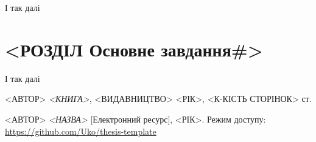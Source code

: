 \documentclass[12pt,a4paper]{article}
\begin{document}
І так далі\cite{web}

\clearpage
\section{<РОЗДІЛ Основне завдання\#>}



І так далі\cite{web}

\clearpage
{}
\begin{thebibliography}{9}

  <АВТОР> \emph{<КНИГА>},
    <ВИДАВНИЦТВО> <РІК>, <К-КІСТЬ СТОРІНОК> ст.
    
  <АВТОР> \emph{<НАЗВА>} [Електронний ресурс],
    <РІК>. Режим доступу:
    \url{https://github.com/Uko/thesis-template}

\end{thebibliography}
\end{document}
